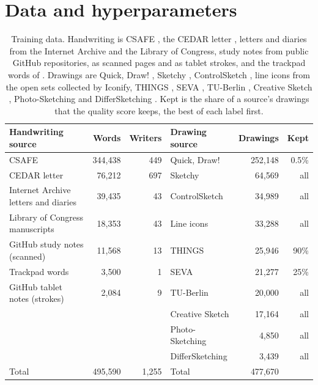 \documentclass{article}
\begin{document}
\section{Data and hyperparameters}

\begin{table}[H]
\caption{Training data. Handwriting is CSAFE \citep{crawford2020csafe}, the CEDAR letter \citep{srihari2002individuality}, letters and diaries from the Internet Archive and the Library of Congress, study notes from public GitHub repositories, as scanned pages and as tablet strokes, and the trackpad words of \citet{greydanus2025cursive}. Drawings are Quick, Draw! \citep{ha2018neural}, Sketchy \citep{sangkloy2016sketchy}, ControlSketch \citep{arar2025swiftsketch}, line icons from the open sets collected by Iconify, THINGS \citep{mukherjee2026drawings}, SEVA \citep{mukherjee2023seva}, TU-Berlin \citep{eitz2012humans}, Creative Sketch \citep{ge2021creative}, Photo-Sketching \citep{li2019photo} and DifferSketching \citep{xiao2022differsketching}. Kept is the share of a source's drawings that the quality score keeps, the best of each label first.}
\label{tab:data}
\vskip 0.1in
\begin{center}
\begin{small}
\begin{tabular}{lrr@{\hskip 3em}lrr}
\toprule
Handwriting source & Words & Writers & Drawing source & Drawings & Kept \\
\midrule
CSAFE & 344,438 & 449 & Quick, Draw! & 252,148 & 0.5\% \\
CEDAR letter & 76,212 & 697 & Sketchy & 64,569 & all \\
Internet Archive letters and diaries & 39,435 & 43 & ControlSketch & 34,989 & all \\
Library of Congress manuscripts & 18,353 & 43 & Line icons & 33,288 & all \\
GitHub study notes (scanned) & 11,568 & 13 & THINGS & 25,946 & 90\% \\
Trackpad words & 3,500 & 1 & SEVA & 21,277 & 25\% \\
GitHub tablet notes (strokes) & 2,084 & 9 & TU-Berlin & 20,000 & all \\
 & & & Creative Sketch & 17,164 & all \\
 & & & Photo-Sketching & 4,850 & all \\
 & & & DifferSketching & 3,439 & all \\
\midrule
Total & 495,590 & 1,255 & Total & 477,670 & \\
\bottomrule
\end{tabular}
\end{small}
\end{center}
\end{table}
\end{document}
